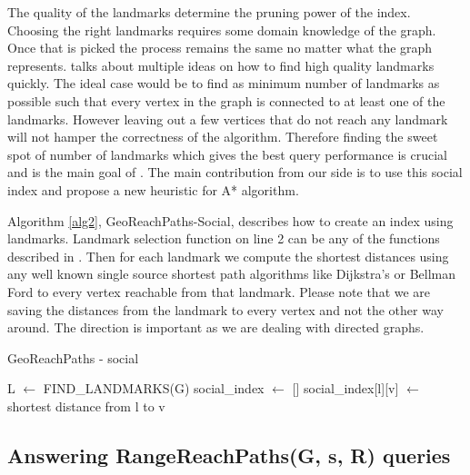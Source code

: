 {The quality of the landmarks determine the pruning power of the index. Choosing the right landmarks requires some domain knowledge of the graph. Once that is picked the process remains the same no matter what the graph represents. \cite{AC2005} talks about multiple ideas on how to find high quality landmarks quickly. The ideal case would be to find as minimum number of landmarks as possible such that every vertex in the graph is connected to at least one of the landmarks.  However leaving out a few vertices that do not reach any landmark will not hamper the correctness of the algorithm. Therefore finding the sweet spot of number of landmarks which gives the best query performance is crucial and is the main goal of \cite{AC2005}. The main contribution from our side is to use this social index and propose a new heuristic for A* algorithm.

Algorithm \ref{alg2}, GeoReachPaths-Social, describes how to create an index using landmarks. Landmark selection function on line 2 can be any of the functions described in \cite{AC2005}. Then for each landmark we compute the shortest distances using any well known single source shortest path algorithms like Dijkstra's or Bellman Ford to every vertex reachable from that landmark. Please note that we are saving the distances from the landmark to every vertex and not the other way around. The direction is important as we are dealing with directed graphs.\\

\begin{algorithm}[t]
\caption{GeoReachPaths - social}
\begin{scriptsize}
\label{alg2}
\begin{algorithmic}[1]

  \State L $\gets$ FIND\_LANDMARKS(G) 
  \State social\_index $\gets$ []
	  	\State social\_index[l][v] $\gets $ shortest distance from l to v
	\EndFor
  \EndFor
\EndFunction
\end{algorithmic}

\end{scriptsize}
\end{algorithm}

\subsection{Answering RangeReachPaths(G, s, R) queries} \label{querying}

}
